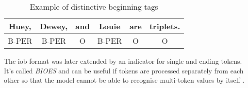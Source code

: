 \begin{table}[ht!]
    \centering
    \begin{tabular}{|c|c|c|c|c|c|}
        \hline
        Huey, & Dewey, & and & Louie & are & triplets. \\
        \hline
        B-PER & B-PER & O & B-PER & O & O \\
        \hline
    \end{tabular}
    \caption{Example of distinctive beginning tags}
    \label{tbl:iob-labelling2}
\end{table}

The \acrshort{iob} format was later extended by an indicator for single and ending tokens. It's called \emph{BIOES} and can be useful if
tokens are processed separately from each other so that the model cannot be able to recognise multi-token values by itself \cite{hofer18}.